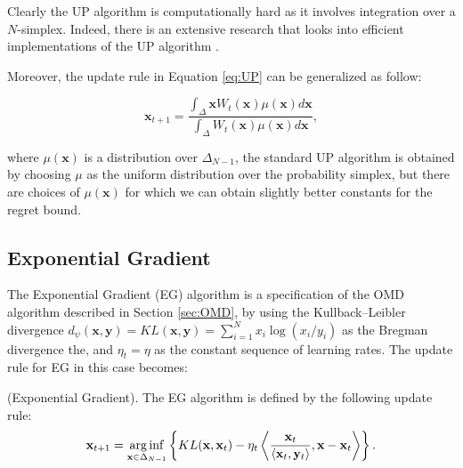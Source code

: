 Clearly the UP algorithm is computationally hard as it involves integration over a $N$-simplex. Indeed, there is an extensive research that looks into efficient implementations of the UP algorithm \cite{kalai2002efficient}.


Moreover, the update rule in Equation \eqref{eq:UP} can be generalized as follow:

\begin{equation}\label{eq:general_UP}
\mathbf x_{t+1}=\frac{\int_{\Delta}\mathbf x W_t(\mathbf x)\mu(\mathbf x)d\mathbf x}{\int_{\Delta} W_t(\mathbf x)\mu(\mathbf x)d\mathbf x},
\end{equation}

where $\mu(\mathbf x)$ is a distribution over $\Delta_{N-1}$, the standard UP algorithm is obtained by choosing $\mu$ as the uniform distribution over the probability simplex, but there are choices of $\mu(\mathbf x)$ for which we can obtain slightly better constants for the regret bound.




\subsection{Exponential Gradient}

The Exponential Gradient (EG) algorithm is a specification of the OMD algorithm described in Section \ref{sec:OMD}, by using the Kullback–Leibler divergence $d_\psi(\mathbf x,\mathbf y)=KL(\mathbf x,\mathbf y)=\sum\limits_{i=1}^Nx_i\log(x_i/y_i)$ as the Bregman divergence the, and $\eta_t=\eta$ as the constant sequence of learning rates. The update rule for EG in this case becomes:

\begin{definition}(Exponential Gradient). The EG algorithm is defined by the following update rule:
\begin{equation}\label{eq:update_EG}
\mathbf x_{t+1}=\operatorname*{arg\,inf}\limits_{\mathbf x\in\Delta_{N-1}} \left\{KL(\mathbf x,\mathbf x_t)-\eta_t\left\langle \frac{\mathbf x_t}{\langle \mathbf x_t,\mathbf y_t\rangle},\mathbf x-\mathbf x_t\right\rangle\right\}.
\end{equation}
\end{definition}

